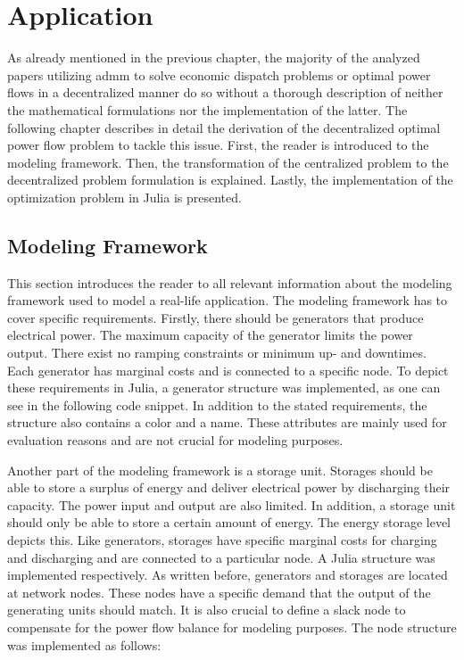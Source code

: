 \section{Application}
\label{sec:app}

As already mentioned in the previous chapter, the majority of the analyzed papers utilizing \gls{admm} to solve economic dispatch problems or optimal power flows in a decentralized manner do so without a thorough description of neither the mathematical formulations nor the implementation of the latter. The following chapter describes in detail the derivation of the decentralized optimal power flow problem to tackle this issue. First, the reader is introduced to the modeling framework. Then, the transformation of the centralized problem to the decentralized problem formulation is explained. Lastly, the implementation of the optimization problem in Julia is presented.

\subsection{Modeling Framework}
\label{sec:app:mod-framework}

This section introduces the reader to all relevant information about the modeling framework used to model a real-life application. The modeling framework has to cover specific requirements. Firstly, there should be generators that produce electrical power. The maximum capacity of the generator limits the power output. There exist no ramping constraints or minimum up- and downtimes. Each generator has marginal costs and is connected to a specific node. To depict these requirements in Julia, a generator structure was implemented, as one can see in the following code snippet. In addition to the stated requirements, the structure also contains a color and a name. These attributes are mainly used for evaluation reasons and are not crucial for modeling purposes. 



Another part of the modeling framework is a storage unit. Storages should be able to store a surplus of energy and deliver electrical power by discharging their capacity. The power input and output are also limited. In addition, a storage unit should only be able to store a certain amount of energy. The energy storage level depicts this. Like generators, storages have specific marginal costs for charging and discharging and are connected to a particular node. A Julia structure was implemented respectively. As written before, generators and storages are located at network nodes. These nodes have a specific demand that the output of the generating units should match. It is also crucial to define a slack node to compensate for the power flow balance for modeling purposes. The node structure was implemented as follows:

